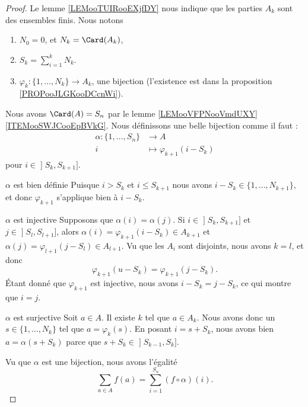 \begin{proof}
    Le lemme \ref{LEMooTUIRooEXjfDY} nous indique que les parties \( A_k\) sont des ensembles finis. Nous notons
    \begin{enumerate}
        \item
            \( N_0=0\), et \( N_k=\Card(A_k)\),
        \item
            \( S_k=\sum_{i=1}^kN_k\).
        \item
            \( \varphi_k\colon \{ 1,\ldots, N_k \}\to A_k\), une bijection (l'existence est dans la proposition \ref{PROPooJLGKooDCcnWi}).
    \end{enumerate}
    Nous avons \( \Card(A)=S_n\) par le lemme \ref{LEMooVFPNooVmdUXY}\ref{ITEMooSWJCooEpBVkG}. Nous définissons une belle bijection comme il faut :
    \begin{equation}
        \begin{aligned}
            \alpha\colon \{ 1,\ldots, S_n \}&\to A \\
            i&\mapsto \varphi_{k+1}(i-S_k) 
        \end{aligned}
    \end{equation}
    pour \( i\in\mathopen] S_k , S_{k+1} \mathclose]\).

    \begin{subproof}
        \item[\( \alpha\) est bien définie]
            Puisque \( i>S_k\) et \( i\leq S_{k+1}\) nous avons \( i-S_k\in \{ 1,\ldots, N_{k+1} \}\), et donc \( \varphi_{k+1}\) s'applique bien à \( i-S_k\).
        \item[\( \alpha\) est injective]
        Supposons que \( \alpha(i)=\alpha(j)\). Si \( i\in \mathopen] S_k , S_{k+1} \mathclose]\) et \( j\in \mathopen] S_l , S_{l+1} \mathclose]\), alors \( \alpha(i)=\varphi_{k+1}(i-S_k)\in A_{k+1}\) et \( \alpha(j)=\varphi_{l+1}(j-S_l)\in A_{l+1}\). Vu que les \( A_i\) sont disjoints, nous avons \( k=l\), et donc
        \begin{equation}
            \varphi_{k+1}(u-S_k)=\varphi_{k+1}(j-S_k).
        \end{equation}
        Étant donné que \( \varphi_{k+1}\) est injective, nous avons \( i-S_k=j-S_k\), ce qui montre que \( i=j\).
    \item[\( \alpha\) est surjective]
    Soit \( a\in A\). Il existe \( k\) tel que \( a\in A_k\). Nous avons donc un \( s\in\{ 1,\ldots, N_k \}\) tel que \( a=\varphi_k(s)\). En posant \( i=s+S_k\), nous avons bien \( a=\alpha(s+S_k)\) parce que \( s+S_k\in \mathopen] S_{k-1} , S_k \mathclose]\).
    \end{subproof}
    Vu que \( \alpha\) est une bijection, nous avons l'égalité
    \begin{equation}
        \sum_{a\in A}f(a)=\sum_{i=1}^{S_n}(f\circ \alpha)(i).
    \end{equation}
    

\end{proof}
